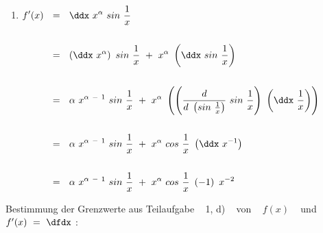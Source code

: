 \begin{enumerate}[leftmargin=*, labelsep=3em, itemsep=3em, label=\alph*)]
	\item $\begin{aligned}[t]
	 f'(x) ~~ &= ~~ \ddx ~ x^{\alpha} ~ sin ~ \frac{1}{x} \\ \\
	 &= ~~ \left( \ddx ~ x^{\alpha} \right) ~ sin ~ \frac{1}{x} ~ + ~ x^{\alpha} ~ \left( \ddx ~ sin ~ \frac{1}{x} \right) \\ \\
	 &= ~~ \alpha ~ x^{\alpha ~ - ~ 1} ~ sin ~ \frac{1}{x} ~ + ~ x^{\alpha} ~ \left( \left( \frac{d}{d ~ \left( sin ~ \frac{1}{x} \right)} ~ sin ~ \frac{1}{x} \right) ~ \left( \ddx ~ \frac{1}{x} \right) \right) \\ \\
	 &= ~~ \alpha ~ x^{\alpha ~ - ~ 1} ~ sin ~ \frac{1}{x} ~ + ~ x^{\alpha}  ~ cos ~ \frac{1}{x} ~ \left( \ddx ~ x^{-1} \right) \\ \\
	 &= ~~ \alpha ~ x^{\alpha ~ - ~ 1} ~ sin ~ \frac{1}{x} ~ + ~ x^{\alpha}  ~ cos ~ \frac{1}{x} ~ \left( -1 \right) ~ x^{-2}
	\end{aligned}$
	
\end{enumerate}



\newpage



Bestimmung der Grenzwerte aus Teilaufgabe ~ 1, d) ~ von ~ $f(x)$ ~ und ~ $f'(x) ~ = ~ \dfdx$ :\\


